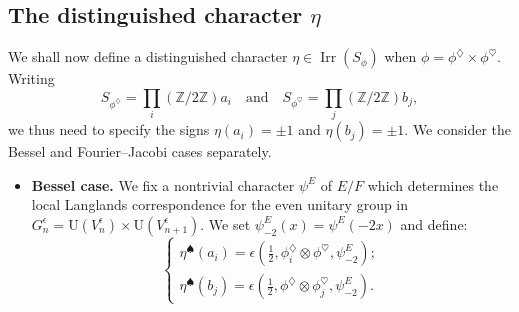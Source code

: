 \documentclass[11pt]{amsart}
\numberwithin{equation}{section}
\theoremstyle{plain}
\theoremstyle{definition}
\theoremstyle{remark}
\def\Irr{\operatorname{Irr}}
\def\U{\mathrm{U}}
\def\ZZ{\mathbb{Z}}
\begin{document}
\subsection{The distinguished character $\eta$} 
\label{SS:eta}

We shall now define a distinguished character $\eta \in \Irr(S_\phi)$ when $\phi =  \phi^{\diamondsuit} \times \phi^{\heartsuit}$.
Writing 
\[  S_{\phi^{\diamondsuit}}  = \prod_i  (\ZZ /2 \ZZ) a_i \quad \text{and} \quad S_{\phi^{\heartsuit}} = \prod_j  (\ZZ / 2\ZZ) b_j, \]
we thus need to specify the signs $\eta(a_i) = \pm 1$ and $\eta(b_j) = \pm 1$.
We consider the Bessel and Fourier--Jacobi cases separately.

\begin{itemize}

\item \textbf{Bessel case.}
We fix a nontrivial character $\psi^E$ of $E/F$ which determines the local Langlands correspondence for the even unitary group in $G_n^\epsilon = \U(V_n^\epsilon) \times \U(V_{n+1}^\epsilon)$.
We set $\psi^E_{-2}(x)  = \psi^E(-2 x)$ and define:
\[
\begin{cases}
 \eta^{\spadesuit}(a_i)  = \epsilon(\frac{1}{2}, \phi^{\diamondsuit}_i \otimes \phi^{\heartsuit}, \psi^E_{-2}); \\
 \eta^{\spadesuit}(b_j)  = \epsilon(\frac{1}{2},  \phi^{\diamondsuit} \otimes \phi^{\heartsuit}_{j}, \psi^E_{-2}).
\end{cases}
\]


\end{itemize}
\end{document}
